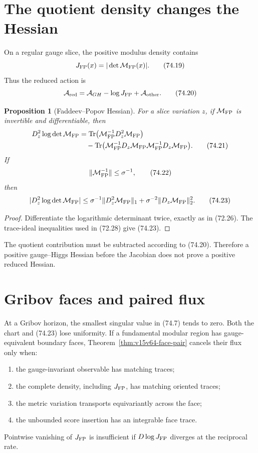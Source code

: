 \documentclass[11pt]{article}
\newtheorem{proposition}[theorem]{Proposition}
\theoremstyle{remark}
\begin{document}
\section{The quotient density changes the Hessian}

On a regular gauge slice, the positive modulus density contains
\[
 J_{\rm FP}(x)=|\det{\cal M}_{\rm FP}(x)|.             \tag{74.19}
\]
Thus the reduced action is
\[
 {\cal A}_{\rm red}
 =
 {\cal A}_{GH}
 -\log J_{\rm FP}
 +{\cal A}_{\rm other}.                               \tag{74.20}
\]

\begin{proposition}[Faddeev--Popov Hessian]
\label{prop:v15v74-fp-hessian}
For a slice variation \(z\), if
\({\cal M}_{\rm FP}\) is invertible and differentiable, then
\[
\begin{split}
 D_z^2\log\det{\cal M}_{\rm FP}
 &=
 \operatorname{Tr}\bigl(
 {\cal M}_{\rm FP}^{-1}D_z^2{\cal M}_{\rm FP}
 \bigr)\\
 &\quad-
 \operatorname{Tr}\bigl(
 {\cal M}_{\rm FP}^{-1}D_z{\cal M}_{\rm FP}
 {\cal M}_{\rm FP}^{-1}D_z{\cal M}_{\rm FP}
 \bigr).                                              \tag{74.21}
\end{split}
\]
If
\[
 \|{\cal M}_{\rm FP}^{-1}\|\leq\sigma^{-1},           \tag{74.22}
\]
then
\[
 |D_z^2\log\det{\cal M}_{\rm FP}|
 \leq
 \sigma^{-1}\|D_z^2{\cal M}_{\rm FP}\|_1+
 \sigma^{-2}\|D_z{\cal M}_{\rm FP}\|_2^2.             \tag{74.23}
\]
\end{proposition}

\begin{proof}
Differentiate the logarithmic determinant twice, exactly as in
(72.26).  The trace-ideal inequalities used in (72.28) give
(74.23).
\end{proof}

The quotient contribution must be subtracted according to
(74.20).  Therefore a positive gauge--Higgs Hessian before the
Jacobian does not prove a positive reduced Hessian.

\section{Gribov faces and paired flux}

At a Gribov horizon, the smallest singular value in (74.7) tends
to zero.  Both the chart and (74.23) lose uniformity.  If a
fundamental modular region has gauge-equivalent boundary faces,
Theorem~\ref{thm:v15v64-face-pair} cancels their flux only when:
\begin{enumerate}
\item the gauge-invariant observable has matching traces;
\item the complete density, including \(J_{\rm FP}\), has matching
      oriented traces;
\item the metric variation transports equivariantly across the
      face;
\item the unbounded score insertion has an integrable face trace.
\end{enumerate}
Pointwise vanishing of \(J_{\rm FP}\) is insufficient if
\(D\log J_{\rm FP}\) diverges at the reciprocal rate.
\end{document}
